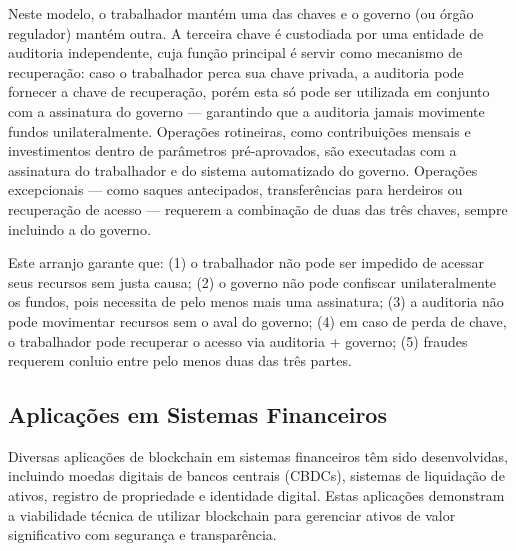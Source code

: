 \begin{figure}[htb]
\end{figure}

Neste modelo, o trabalhador mantém uma das chaves e o governo (ou órgão regulador) mantém outra. A terceira chave é custodiada por uma entidade de auditoria independente, cuja função principal é servir como mecanismo de recuperação: caso o trabalhador perca sua chave privada, a auditoria pode fornecer a chave de recuperação, porém esta só pode ser utilizada em conjunto com a assinatura do governo --- garantindo que a auditoria jamais movimente fundos unilateralmente. Operações rotineiras, como contribuições mensais e investimentos dentro de parâmetros pré-aprovados, são executadas com a assinatura do trabalhador e do sistema automatizado do governo. Operações excepcionais --- como saques antecipados, transferências para herdeiros ou recuperação de acesso --- requerem a combinação de duas das três chaves, sempre incluindo a do governo.

Este arranjo garante que: (1) o trabalhador não pode ser impedido de acessar seus recursos sem justa causa; (2) o governo não pode confiscar unilateralmente os fundos, pois necessita de pelo menos mais uma assinatura; (3) a auditoria não pode movimentar recursos sem o aval do governo; (4) em caso de perda de chave, o trabalhador pode recuperar o acesso via auditoria + governo; (5) fraudes requerem conluio entre pelo menos duas das três partes.

\subsection{Aplicações em Sistemas Financeiros}

Diversas aplicações de blockchain em sistemas financeiros têm sido desenvolvidas, incluindo moedas digitais de bancos centrais (CBDCs), sistemas de liquidação de ativos, registro de propriedade e identidade digital. Estas aplicações demonstram a viabilidade técnica de utilizar blockchain para gerenciar ativos de valor significativo com segurança e transparência.

